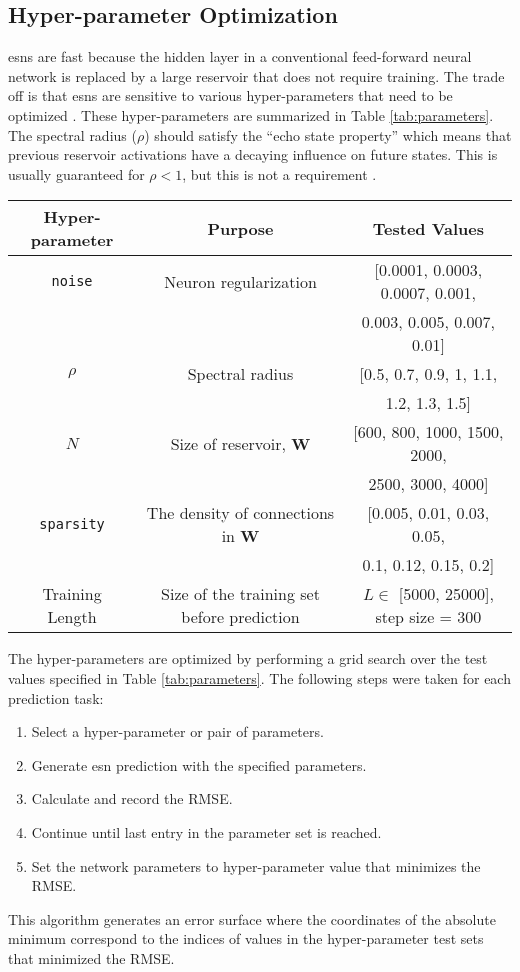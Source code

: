  \subsection{Hyper-parameter Optimization}

 \glspl{esn} are fast because the hidden layer in a conventional feed-forward neural network is replaced by a large reservoir that does not require training.
 The trade off is that \glspl{esn} are sensitive to various hyper-parameters
 that need to be optimized \cite{lukosevicius_practical_2012}. These hyper-parameters are summarized in Table \ref{tab:parameters}. The spectral radius ($\rho$) should satisfy the ``echo state property'' which means that
 previous reservoir activations have a decaying influence on future states. This
 is usually guaranteed for $\rho < 1$, but this is not a requirement
 \cite{lukosevicius_practical_2012}.
 \begin{table*}[ht]
   \centering
   \caption{Description of Model Hyper-parameters}
   \label{tab:parameters}
   \begin{tabular}{c|c|c}
     \hline
     Hyper-parameter & Purpose & Tested Values\\
     \hline
     \texttt{noise} & Neuron regularization & [0.0001, 0.0003, 0.0007, 0.001, \\
     &&0.003, 0.005, 0.007, 0.01]\\
     $\rho$ & Spectral radius & [0.5, 0.7, 0.9, 1, 1.1, \\
     &&1.2, 1.3, 1.5]\\
     $N$ & Size of reservoir, \textbf{W} & [600, 800, 1000, 1500, 2000, \\
     &&2500, 3000, 4000]\\
     \texttt{sparsity} & The density of connections in \textbf{W}& [0.005, 0.01, 0.03, 0.05, \\
     &&0.1, 0.12, 0.15, 0.2]\\
     Training Length & Size of the training set before prediction & $L \in$ [5000, 25000], step size = 300
   \end{tabular}
 \end{table*}

 The hyper-parameters are optimized by performing a grid search over the test values specified in Table \ref{tab:parameters}. The following steps were taken for each prediction task:
 \begin{enumerate}
   \item Select a hyper-parameter or pair of parameters.
   \item Generate \gls{esn} prediction with the specified parameters.
   \item Calculate and record the RMSE.
   \item Continue until last entry in the parameter set is reached.
   \item Set the network parameters to hyper-parameter value that minimizes the RMSE.
 \end{enumerate}
 This algorithm generates an error surface where the coordinates of the absolute
 minimum correspond to the indices of values in the hyper-parameter test sets that minimized the RMSE.

